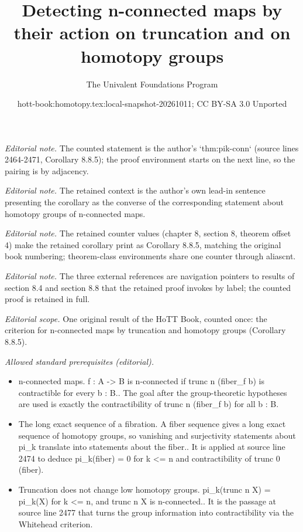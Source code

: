 \documentclass[10pt,a4paper]{article}
\title{Detecting n-connected maps by their action on truncation and on homotopy groups}
\author{The Univalent Foundations Program}
\date{hott-book:homotopy.tex:local-snapshot-20261011; CC BY-SA 3.0 Unported}
\newcounter{chapter}
\theoremstyle{definition}
\theoremstyle{remark}
\numberwithin{equation}{section}
\begin{document}
\maketitle
\setcounter{chapter}{8}
\setcounter{section}{8}
\setcounter{thm}{4}
\noindent\textit{Editorial note.} The counted statement is the author's `thm:pik-conn` (source lines 2464-2471, Corollary 8.8.5); the proof environment starts on the next line, so the pairing is by adjacency.\par\medskip
\noindent\textit{Editorial note.} The retained context is the author's own lead-in sentence presenting the corollary as the converse of the corresponding statement about homotopy groups of n-connected maps.\par\medskip
\noindent\textit{Editorial note.} The retained counter values (chapter 8, section 8, theorem offset 4) make the retained corollary print as Corollary 8.8.5, matching the original book numbering; theorem-class environments share one counter through aliascnt.\par\medskip
\noindent\textit{Editorial note.} The three external references are navigation pointers to results of section 8.4 and section 8.8 that the retained proof invokes by label; the counted proof is retained in full.\par\medskip
\noindent\textit{Editorial scope.} One original result of the HoTT Book, counted once: the criterion for n-connected maps by truncation and homotopy groups (Corollary 8.8.5).\par\medskip
\noindent\textit{Allowed standard prerequisites (editorial).}\begin{itemize}
\item n-connected maps. f : A -> B is n-connected if trunc n (fiber\_f b) is contractible for every b : B.. The goal after the group-theoretic hypotheses are used is exactly the contractibility of trunc n (fiber\_f b) for all b : B.
\item The long exact sequence of a fibration. A fiber sequence gives a long exact sequence of homotopy groups, so vanishing and surjectivity statements about pi\_k translate into statements about the fiber.. It is applied at source line 2474 to deduce pi\_k(fiber) = 0 for k <= n and contractibility of trunc 0 (fiber).
\item Truncation does not change low homotopy groups. pi\_k(trunc n X) = pi\_k(X) for k <= n, and trunc n X is n-connected.. It is the passage at source line 2477 that turns the group information into contractibility via the Whitehead criterion.
\end{itemize}\medskip
\end{document}
